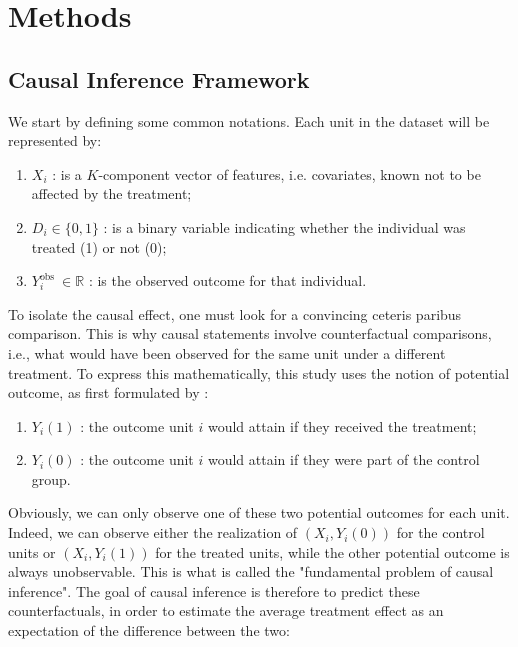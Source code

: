 \section{Methods}

\subsection{Causal Inference Framework}

We start by defining some common notations. Each unit in the dataset will be represented by:

\begin{enumerate}
    \item \textbf{$X_{i}$} : is a $K$-component vector of features, i.e. covariates, known not to be affected by the treatment;
    \item $D_{i} \in\{0,1\}$ : is a binary variable indicating whether the individual was treated (1) or not (0);
    \item $Y_{i}^{\text {obs }} \in \mathbb{R}$ : is the observed outcome for that individual.
\end{enumerate}

To isolate the causal effect, one must look for a convincing ceteris paribus comparison. This is why causal statements involve counterfactual comparisons, i.e., what would have been observed for the same unit under a different treatment. To express this mathematically, this study uses the notion of potential outcome, as first formulated by \citet{rubin1974estimating}:

\begin{enumerate}
    \item $Y_{i}(1)$ : the outcome unit $i$ would attain if they received the treatment;
    \item $Y_{i}(0)$ : the outcome unit $i$ would attain if they were part of the control group.
\end{enumerate}

Obviously, we can only observe one of these two potential outcomes for each unit. Indeed, we can observe either the realization of $\left(X_{i}, Y_{i}(0)\right)$ for the control units or $\left(X_{i}, Y_{i}(1)\right)$ for the treated units, while the other potential outcome is always unobservable. This is what is called the "fundamental problem of causal inference". The goal of causal inference is therefore to predict these counterfactuals, in order to estimate the average treatment effect as an expectation of the difference between the two:

